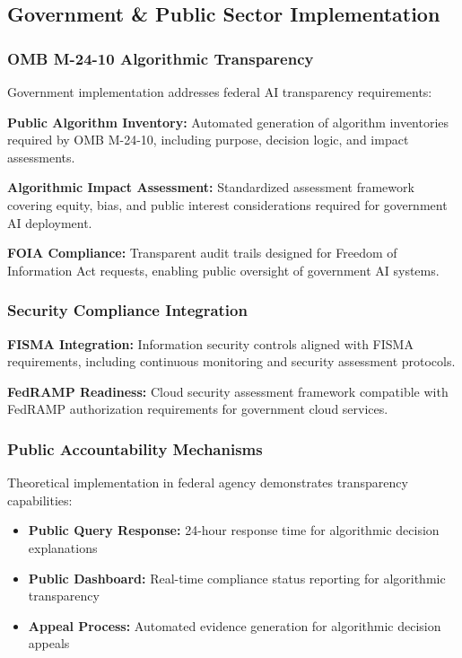\documentclass[12pt,a4paper]{article}
\begin{document}
\subsection{Government \& Public Sector Implementation}

\subsubsection{OMB M-24-10 Algorithmic Transparency}

Government implementation addresses federal AI transparency requirements:

\textbf{Public Algorithm Inventory:} Automated generation of algorithm inventories required by OMB M-24-10, including purpose, decision logic, and impact assessments.

\textbf{Algorithmic Impact Assessment:} Standardized assessment framework covering equity, bias, and public interest considerations required for government AI deployment.

\textbf{FOIA Compliance:} Transparent audit trails designed for Freedom of Information Act requests, enabling public oversight of government AI systems.

\subsubsection{Security Compliance Integration}

\textbf{FISMA Integration:} Information security controls aligned with FISMA requirements, including continuous monitoring and security assessment protocols.

\textbf{FedRAMP Readiness:} Cloud security assessment framework compatible with FedRAMP authorization requirements for government cloud services.

\subsubsection{Public Accountability Mechanisms}

Theoretical implementation in federal agency demonstrates transparency capabilities:

\begin{itemize}
\item \textbf{Public Query Response:} 24-hour response time for algorithmic decision explanations
\item \textbf{Public Dashboard:} Real-time compliance status reporting for algorithmic transparency
\item \textbf{Appeal Process:} Automated evidence generation for algorithmic decision appeals
\end{itemize}
\end{document}
